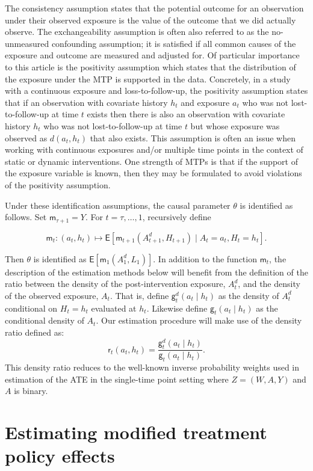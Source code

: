 \documentclass[twoside,11pt]{article}
\newcommand{\Q}{\mathsf{m}}
\renewcommand{\r}{\mathsf{r}}
\newcommand{\g}{\mathsf{g}}
\newcommand{\E}{\mathsf{E}}
\begin{document}
The consistency assumption states that the potential outcome for an observation under their observed exposure is the value of the outcome that we did actually observe. The exchangeability assumption is often also referred to as the no-unmeasured confounding assumption; it is satisfied if all common causes of the exposure and outcome are measured and adjusted for. Of particular importance to this article is the positivity assumption which states that the distribution of the exposure under the MTP is supported in the data. Concretely, in a study with a continuous exposure and loss-to-follow-up, the positivity assumption states that if an observation with covariate history $h_t$ and exposure $a_t$ who was not lost-to-follow-up at time $t$ exists then there is also an observation with covariate history $h_t$ who was not lost-to-follow-up at time $t$ but whose exposure was observed as $d(a_t, h_t)$ that also exists. This assumption is often an issue when working with continuous exposures and/or multiple time points in the context of static or dynamic interventions. One strength of MTPs is that if the support of the exposure variable is known, then they may be formulated to avoid violations of the positivity assumption.

Under these identification assumptions, the causal parameter $\theta$ is identified as follows. Set $\Q_{\tau+1}= Y$. For $t=\tau,\ldots,1$, recursively define

\begin{equation}
  \Q_t:(a_t, h_t) \mapsto \E\left[\Q_{t+1}(A_{t+1}^d, H_{t+1})\mid
    A_t=a_t, H_t=h_t\right].\label{eq:defQ}
\end{equation} 

Then $\theta$ is identified as $\E[\Q_1(A_1^d, L_1)]$. In addition to the function $\Q_t$, the description of the estimation methods below will benefit from the definition of the ratio between the density of the post-intervention exposure, $A_t^d$, and the density of the observed exposure, $A_t$. That is, define $\g_t^d(a_t \mid h_t)$ as the density of $A_t^d$ conditional on $H_t=h_t$ evaluated at $h_t$. Likewise define $\g_t(a_t\mid h_t)$ as the conditional density of $A_t$. Our estimation procedure will make use of the density ratio defined as: \[\r_t(a_t, h_t) = \frac{\g_t^d(a_t \mid h_t)}{\g_t(a_t \mid h_t)}.\] This density ratio reduces to the well-known inverse probability weights used in estimation of the ATE in the single-time point setting where $Z=(W,A,Y)$ and $A$ is binary.

\hypertarget{estimating-modified-treatment-policy-effects}{\section{Estimating modified treatment policy effects}\label{estimating-modified-treatment-policy-effects}}
\end{document}
